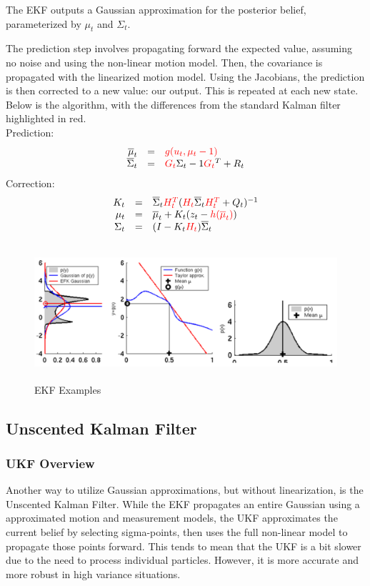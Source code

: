 \documentclass[twoside]{article}
\begin{document}
The EKF outputs a Gaussian approximation for the posterior belief, parameterized by ${\mu}_t$ and ${\Sigma}_t$.

 The prediction step involves propagating forward the expected value, assuming no noise and using the non-linear motion model. Then, the covariance is propagated with the linearized motion model. Using the Jacobians, the prediction is then corrected to a new value: our output. This is repeated at each new state. Below is the algorithm, with the differences from the standard Kalman filter highlighted in red. \\

Prediction:
$$\begin{array}{rcl} 
    \overline{\mu}_t & = & \textcolor{red}{g(u_t,{\mu}_t-1)}\\
    \overline{\Sigma}_t & = & \textcolor{red}{G_t}{\Sigma}_t-1\textcolor{red}{G_t}^T + R_t 
\end{array}$$
Correction:
$$\begin{array}{rcl}
    K_t & = & \overline{\Sigma}_{t}\textcolor{red}{H_t^T}(\textcolor{red}{H_t}\overline{\Sigma}_t\textcolor{red}{H_t^T} + Q_t)^{-1}\\
    {\mu}_t & = & \overline{\mu}_t + K_t(z_t - \textcolor{red}{h(\overline{\mu}_t)})\\
    {\Sigma}_t & = & (I - K_t\textcolor{red}{H_t})\overline{\Sigma}_t
\end{array}$$

\begin{figure}[h]
    \includegraphics[width=0.9\linewidth, height=5cm]{scribe_EKFexamples} 
    \caption{EKF Examples}
    \label{fig:EKFexamples}
\end{figure}

\subsection{Unscented Kalman Filter}

\subsubsection{UKF Overview}
Another way to utilize Gaussian approximations, but without linearization, is the Unscented Kalman Filter. While the EKF propagates an entire Gaussian using a approximated motion and measurement models, the UKF approximates the current belief by selecting sigma-points, then uses the full non-linear model to propagate those points forward. This tends to mean that the UKF is a bit slower due to the need to process individual particles. However, it is more accurate and more robust in high variance situations. 
\end{document}
